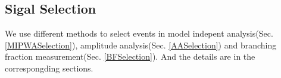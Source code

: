 \subsection{Sigal Selection}
\par{


    We use different methods to select events in model indepent analysis(Sec. \ref{MIPWASelection}), amplitude analysis(Sec. \ref{AASelection}) and branching fraction measurement(Sec. \ref{BFSelection}).
And the details are in the correspongding sections.
}




